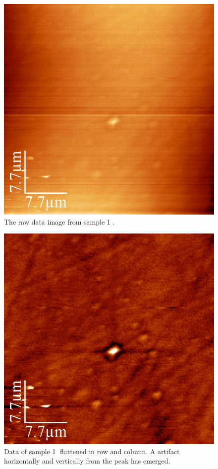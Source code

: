 \documentclass[paper=a4,fontsize=10pt,DIV=18,twocolumn,parskip=half]{scrartcl}
\numberwithin{equation}{section}    %
\begin{document}
\begin{figure}[htp]
    \begin{center}
        \includegraphics[width=0.7\columnwidth]{Bilder/1}
        \caption{The raw data image from sample \textcircled{1}. }
        \label{1}
    \end{center}
\end{figure}

\begin{figure}[htp]
    \begin{center}
        \includegraphics[width=0.7\columnwidth]{Bilder/1f}
        \caption{Data of sample \textcircled{1} flattened in row and column. A artifact horizontally and vertically from the peak has emerged.}
        \label{7f}
    \end{center}
\end{figure}
\end{document}
